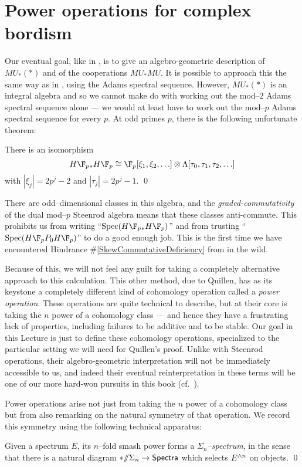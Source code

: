 \section{Power operations for complex bordism}


Our eventual goal, like in , is to give an algebro-geometric description of $MU_*(*)$ and of the cooperations $MU_* MU$.  It is possible to approach this the same way as in , using the Adams spectral sequence.  However, $MU_*(*)$ is an integral algebra and so we cannot make do with working out the mod--$2$ Adams spectral sequence alone --- we would at least have to work out the mod--$p$ Adams spectral sequence for every $p$.  At odd primes $p$, there is the following unfortunate theorem:
\begin{theorem}
There is an isomorphism
\[H\F_p{}_* H\F_p \cong \F_p[\xi_1, \xi_2, \ldots] \otimes \Lambda[\tau_0, \tau_1, \tau_2, \ldots]\]
with $|\xi_j| = 2p^j-2$ and $|\tau_j| = 2p^j - 1$. \qed
\end{theorem}
\noindent There are odd--dimensional classes in this algebra, and the \emph{graded-commutativity} of the dual mod--$p$ Steenrod algebra means that these classes anti-commute.  This prohibits us from writing ``$\Spec(H\F_p{}_* H\F_p)$'' and from trusting ``$\Spec(H\F_pP_0 H\F_p)$'' to do a good enough job.  This is the first time we have encountered Hindrance \#\ref{SkewCommutativeDeficiency} from  in the wild.

Because of this, we will not feel any guilt for taking a completely alternative approach to this calculation.  This other method, due to Quillen, has as its keystone a completely different kind of cohomology operation called a \textit{power operation}.  These operations are quite technical to describe, but at their core is taking the $n${\th} power of a cohomology class --- and hence they have a frustrating lack of properties, including failures to be additive and to be stable.  Our goal in this Lecture is just to define these cohomology operations, specialized to the particular setting we will need for Quillen's proof.  Unlike with Steenrod operations, their algebro-geometric interpretation will not be immediately accessible to us, and indeed their eventual reinterpretation in these terms will be one of our more hard-won pursuits in this book (cf.\ ).

Power operations arise not just from taking the $n${\th} power of a cohomology class but from also remarking on the natural symmetry of that operation.  We record this symmetry using the following technical apparatus:
\begin{lemma}
Given a spectrum $E$, its $n$--fold smash power forms a \textit{$\Sigma_n$--spectrum}, in the sense that there is a natural diagram $* /\!\!/ \Sigma_n \to \mathsf{Spectra}$ which selects $E^{\wedge n}$ on objects. \qed
\end{lemma}

